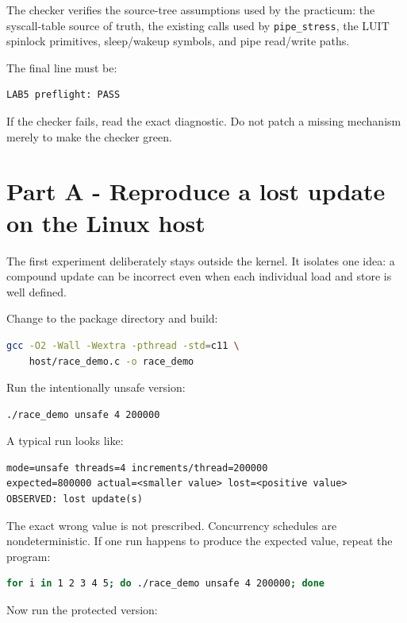 \documentclass[11pt,a4paper]{article}
\newcommand{\file}[1]{\texttt{#1}}
\begin{document}
The checker verifies the source-tree assumptions used by the practicum: the syscall-table source of truth, the existing calls used by \file{pipe\_stress}, the LUIT spinlock primitives, sleep/wakeup symbols, and pipe read/write paths.

The final line must be:

\begin{lstlisting}
LAB5 preflight: PASS
\end{lstlisting}

If the checker fails, read the exact diagnostic. Do not patch a missing mechanism merely to make the checker green.

\section{Part A - Reproduce a lost update on the Linux host}

The first experiment deliberately stays outside the kernel. It isolates one idea: a compound update can be incorrect even when each individual load and store is well defined.

Change to the package directory and build:

\begin{lstlisting}[language=bash]
gcc -O2 -Wall -Wextra -pthread -std=c11 \
    host/race_demo.c -o race_demo
\end{lstlisting}

Run the intentionally unsafe version:

\begin{lstlisting}[language=bash]
./race_demo unsafe 4 200000
\end{lstlisting}

A typical run looks like:

\begin{lstlisting}
mode=unsafe threads=4 increments/thread=200000
expected=800000 actual=<smaller value> lost=<positive value>
OBSERVED: lost update(s)
\end{lstlisting}

The exact wrong value is not prescribed. Concurrency schedules are nondeterministic. If one run happens to produce the expected value, repeat the program:

\begin{lstlisting}[language=bash]
for i in 1 2 3 4 5; do ./race_demo unsafe 4 200000; done
\end{lstlisting}

Now run the protected version:
\end{document}
